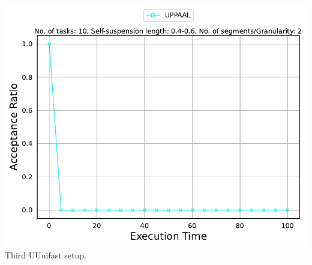 \documentclass[]{article}
\begin{document}
\begin{minipage}[t]{0.48\linewidth}
            \includegraphics[width=\linewidth]{UPPAAL[2][0.4-0.6][10].pdf}
		Third UUnifast setup.
		\vspace{0.3cm} 
		

		
	\end{minipage}\hfill
\end{document}
